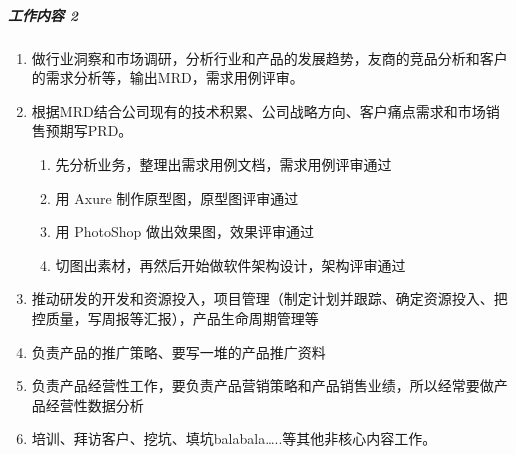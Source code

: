 \documentclass[letterpaper,10pt,english]{sphinxmanual}
\begin{document}
\begin{center}\end{center}  


\subparagraph{工作内容 2\sphinxfootnotemark[184]}
\label{\detokenize{chapter_introduction/PM:id25}}%
\begin{footnotetext}[184]\sphinxAtStartFootnote
{}
%
\end{footnotetext}\ignorespaces \begin{enumerate}
%
\item {} 
做行业洞察和市场调研，分析行业和产品的发展趋势，友商的竞品分析和客户的需求分析等，输出MRD，需求用例评审。

\item {} 
根据MRD结合公司现有的技术积累、公司战略方向、客户痛点需求和市场销售预期写PRD。
\begin{enumerate}
%
\item {} 
先分析业务，整理出需求用例文档，需求用例评审通过%
\begin{footnote}[185]\sphinxAtStartFootnote
{}
%
\end{footnote}

\item {} 
用 Axure 制作原型图，原型图评审通过

\item {} 
用 PhotoShop 做出效果图，效果评审通过

\item {} 
切图出素材，再然后开始做软件架构设计，架构评审通过

\end{enumerate}

\item {} 
推动研发的开发和资源投入，项目管理（制定计划并跟踪、确定资源投入、把控质量，写周报等汇报），产品生命周期管理等

\item {} 
负责产品的推广策略、要写一堆的产品推广资料

\item {} 
负责产品经营性工作，要负责产品营销策略和产品销售业绩，所以经常要做产品经营性数据分析

\item {} 
培训、拜访客户、挖坑、填坑balabala…..等其他非核心内容工作。

\end{enumerate}
\end{document}
